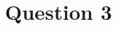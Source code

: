 \documentclass[12pt]{article}
\begin{document}
\begin{enumerate}[a.]




\end{enumerate}

\section*{Question 3}
\end{document}
